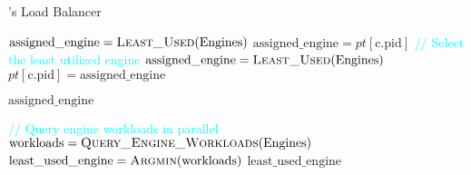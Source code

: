 

\begin{algorithm}[t]
    \small
    \caption{\text{\name}'s Load Balancer}
    \label{algorithm:load_balancer}
    \begin{algorithmic}[1]

          
            \State $\text{assigned\_engine} = \Call{Least\_Used}{\text{Engines}}$ 
        \Else
              
                \State $\text{assigned\_engine} = pt[\text{c.pid}]$ 
            \Else
                \State \textcolor{cyan}{// Select the least utilized engine} 
                \State $\text{assigned\_engine} = \Call{Least\_Used}{\text{Engines}}$ 
                \State $pt[\text{c.pid}] = \text{assigned\_engine}$ 
            \EndIf
        \EndIf
    
        \State \Return $\text{assigned\_engine}$
    \EndProcedure
    
        \State \textcolor{cyan}{// Query engine workloads in parallel} 
        \State $\text{workloads} = \Call{Query\_Engine\_Workloads}{\text{Engines}}$
        \State $\text{least\_used\_engine} = \Call{Argmin}{\text{workloads}}$ 
        \State \Return $\text{least\_used\_engine}$
    \EndProcedure
    \end{algorithmic}
\end{algorithm}